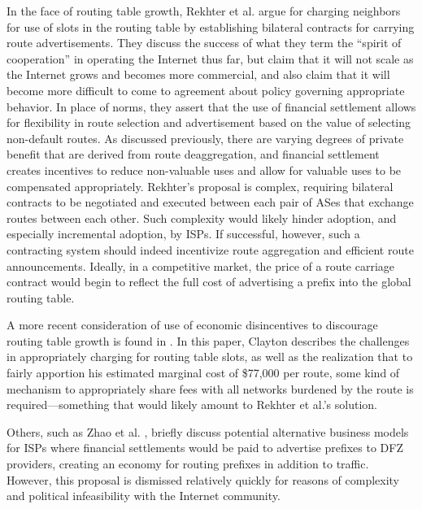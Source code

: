 In the face of routing table growth, Rekhter et al. \cite{Rekhter:1997mi} argue
for charging neighbors for use of slots in the routing table by establishing
bilateral contracts for carrying route advertisements. They discuss the success
of what they term the ``spirit of cooperation'' in operating the Internet thus
far, but claim that it will not scale as the Internet grows and becomes more
commercial, and also claim that it will become more difficult to come to
agreement about policy governing appropriate behavior. In place of norms, they
assert that the use of financial settlement allows for flexibility in route
selection and advertisement based on the value of selecting non-default routes.
As discussed previously, there are varying degrees of private benefit that are
derived from route deaggregation, and financial settlement creates incentives
to reduce non-valuable uses and allow for valuable uses to be compensated
appropriately. Rekhter's proposal is complex, requiring bilateral contracts to
be negotiated and executed between each pair of ASes that exchange routes
between each other. Such complexity would likely hinder adoption, and
especially incremental adoption, by ISPs. If successful, however, such a
contracting system should indeed incentivize route aggregation and efficient
route announcements. Ideally, in a competitive market, the price of a route
carriage contract would begin to reflect the full cost of advertising a prefix
into the global routing table.

A more recent consideration of use of economic disincentives to discourage
routing table growth is found in \cite{Clayton:2010bh}. In this paper, Clayton
describes the challenges in appropriately charging for routing table slots, as
well as the realization that to fairly apportion his estimated marginal cost of
\$77,000 per route, some kind of mechanism to appropriately share fees with all
networks burdened by the route is required---something that would likely amount
to Rekhter et al.'s solution.

Others, such as Zhao et al. \cite{Zhao:2001ly}, briefly discuss potential
alternative business models for ISPs where financial settlements would be paid
to advertise prefixes to DFZ providers, creating an economy for routing
prefixes in addition to traffic. However, this proposal is dismissed relatively
quickly for reasons of complexity and political infeasibility with the Internet
community.

